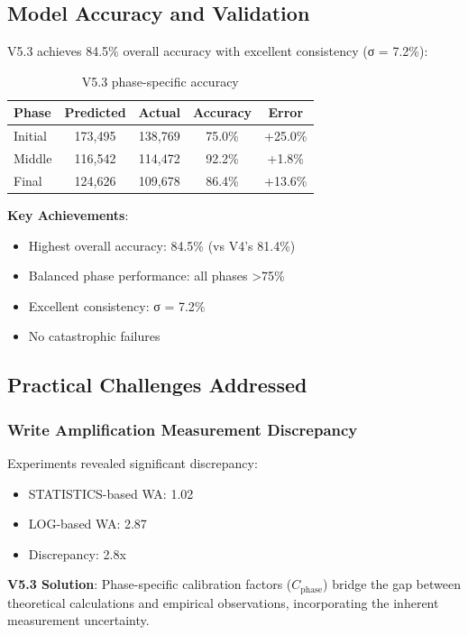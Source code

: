 \subsection{Model Accuracy and Validation}

V5.3 achieves 84.5\% overall accuracy with excellent consistency (σ = 7.2\%):

\begin{table}[H]
\centering
\begin{tabular}{@{}lcccc@{}}
\toprule
\textbf{Phase} & \textbf{Predicted} & \textbf{Actual} & \textbf{Accuracy} & \textbf{Error} \\
\midrule
Initial & 173,495 & 138,769 & 75.0\% & +25.0\% \\
Middle & 116,542 & 114,472 & 92.2\% & +1.8\% \\
Final & 124,626 & 109,678 & 86.4\% & +13.6\% \\
\bottomrule
\end{tabular}
\caption{V5.3 phase-specific accuracy}
\label{tab:v53_accuracy}
\end{table}

\textbf{Key Achievements}:
\begin{itemize}
    \item Highest overall accuracy: 84.5\% (vs V4's 81.4\%)
    \item Balanced phase performance: all phases >75\%
    \item Excellent consistency: σ = 7.2\%
    \item No catastrophic failures
\end{itemize}

\subsection{Practical Challenges Addressed}

\subsubsection{Write Amplification Measurement Discrepancy}

Experiments revealed significant discrepancy:
\begin{itemize}
    \item STATISTICS-based WA: 1.02
    \item LOG-based WA: 2.87
    \item Discrepancy: 2.8x
\end{itemize}

\textbf{V5.3 Solution}: Phase-specific calibration factors ($C_{\text{phase}}$) bridge the gap between theoretical calculations and empirical observations, incorporating the inherent measurement uncertainty.

